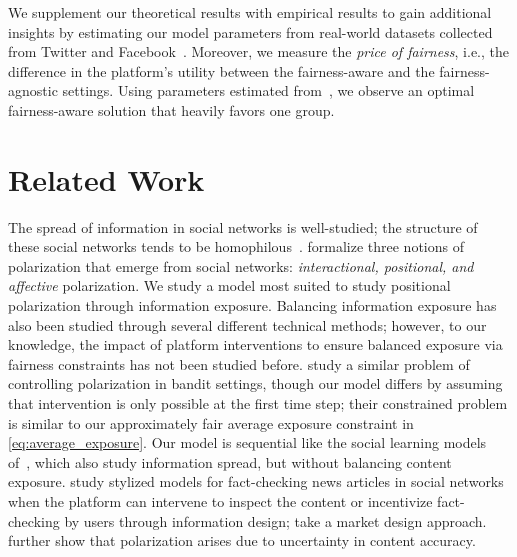\documentclass[letterpaper]{article} %
\begin{document}
We supplement our theoretical results with empirical results to gain additional insights by estimating our model parameters from real-world datasets collected from Twitter and Facebook~\citep{balancedExposure,ReplicationExposure}.
Moreover, we measure the \emph{price of fairness}, i.e., the difference in the platform's utility between the fairness-aware and the fairness-agnostic settings.
Using parameters estimated from~\citet{ReplicationExposure}, we observe an optimal fairness-aware solution that heavily favors one group.

\section{Related Work}\label{sec:background_and_related_work}

The spread of information in social networks is well-studied; the structure of these social networks tends to be homophilous~\citep{mcpherson2001birds,lazarsfeld1948mass}.
\citet{Yarchi2020PoliticalPO} formalize three notions of polarization that emerge from social networks: \emph{interactional, positional, and affective} polarization.
We study a model most suited to study positional polarization through information exposure.
Balancing information exposure has also been studied through several different technical methods; however, to our knowledge, the impact of platform interventions to ensure balanced exposure via fairness constraints has not been studied before.
\citet{celis2019controlling} study a similar problem of controlling polarization in bandit settings, though our model differs by assuming that intervention is only possible at the first time step; their constrained problem is similar to our approximately fair average exposure constraint in \eqref{eq:average_exposure}.
Our model is sequential like the social learning models of~\citet{banerjee1992simple,bikhchandani1992theory}, which also study information spread, but without balancing content exposure.
\citet{papanastasiou2020fake,candogan2020optimal} study stylized models for fact-checking news articles in social networks when the platform can intervene to inspect the content or incentivize fact-checking by users through information design;
\citet{cisternas2020fake} take a market design approach.
\citet{allon2019information} further show that polarization arises due to  uncertainty in content accuracy.
\end{document}
